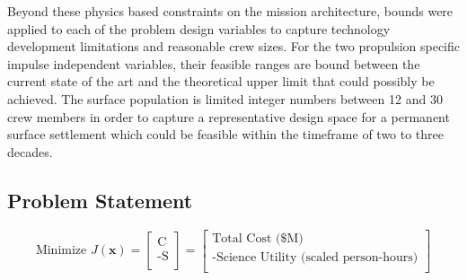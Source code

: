 \documentclass[]{aiaa-pretty}
\begin{document}
Beyond these physics based constraints on the mission architecture, bounds were applied to each of the problem design variables to capture technology development limitations and reasonable crew sizes. For the two propulsion specific impulse independent variables, their feasible ranges are bound between the current state of the art and the theoretical upper limit that could possibly be achieved. The surface population is limited integer numbers between 12 and 30 crew members in order to capture a representative design space for a permanent surface settlement which could be feasible within the timeframe of two to three decades.

\subsection{Problem Statement}
\label{sec:problemstatement}
\begin{equation*}
\mbox{Minimize } J(\mathbf{x})
=
\begin{bmatrix}
\mbox{C}\\
\mbox{-S}\\
\end{bmatrix}
=
\begin{bmatrix}
\mbox{Total Cost (\$M)}\\
\mbox{-Science Utility (scaled person-hours)}\\
\end{bmatrix}
\end{equation*}
\end{document}
